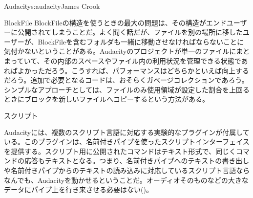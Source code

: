 \begin{aosachapter}{Audacity}{s:audacity}{James Crook}
\begin{aosasect1}{BlockFile}
BlockFileの構造を使うときの最大の問題は、その構造がエンドユーザーに公開されてしまうことだ。よく聞く話だが、ファイルを別の場所に移したユーザーが、BlockFileを含むフォルダも一緒に移動させなければならないことに気付かないということがある。Audacityのプロジェクトが単一のファイルにまとまっていて、その内部のスペースやファイル内の利用状況を管理できる状態であればよかっただろう。こうすれば、パフォーマンスはどちらかといえば向上するだろう。追加で必要となるコードは、おそらくガベージコレクションであろう。シンプルなアプローチとしては、ファイルのみ使用領域が設定した割合を上回るときにブロックを新しいファイルへコピーするという方法がある。

\end{aosasect1}

\begin{aosasect1}{スクリプト}

Audacityには、複数のスクリプト言語に対応する実験的なプラグインが付属している。このプラグインは、名前付きパイプを使ったスクリプトインターフェイスを提供する。スクリプト用に公開されたコマンドはテキスト形式で、同じくコマンドの応答もテキストとなる。つまり、名前付きパイプへのテキストの書き出しや名前付きパイプからのテキストの読み込みに対応しているスクリプト言語ならなんでも、Audacityを動かせるということだ。オーディオそのものなどの大きなデータにパイプ上を行き来させる必要はない()。


\end{aosasect1}
\end{aosachapter}
